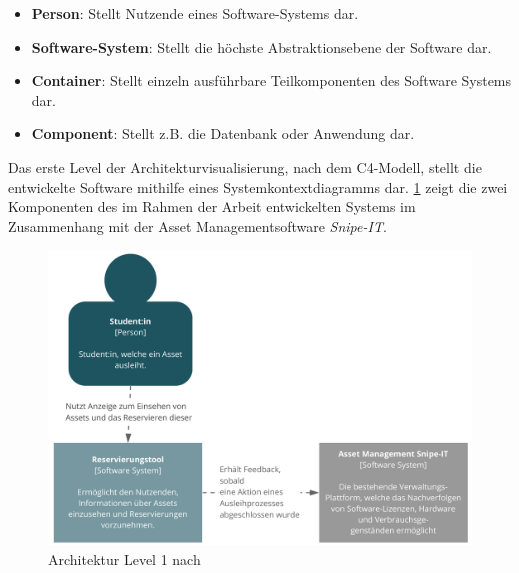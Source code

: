 \begin{itemize}
    \item \textbf{Person}: Stellt Nutzende eines Software-Systems dar.
    \item \textbf{Software-System}: Stellt die höchste Abstraktionsebene der
          Software dar.
    \item \textbf{Container}: Stellt einzeln ausführbare Teilkomponenten des
          Software Systems dar.
    \item \textbf{Component}: Stellt z.B. die Datenbank oder Anwendung dar.
\end{itemize}

{\sffamily\color{maincolor}{Level 1: Context}}

Das erste Level der Architekturvisualisierung, nach dem C4-Modell, stellt die
entwickelte Software mithilfe eines Systemkontextdiagramms dar. \ref{fig:level1}
zeigt die zwei Komponenten des im Rahmen der Arbeit entwickelten Systems im
Zusammenhang mit der Asset Managementsoftware \textit{Snipe-IT}.

\begin{figure}[h]
    \centering
    \includegraphics[scale=0.4]{Bilder/C4_1.pdf}
    \caption[Architektur Level 1]{Architektur Level 1 nach
        }
    \label{fig:level1}
\end{figure}

